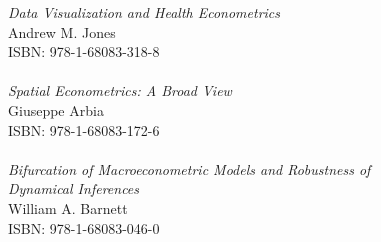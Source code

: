 \vspace{12pt}
\noindent \textit{Data Visualization and Health Econometrics}\\
Andrew M. Jones\\
ISBN: 978-1-68083-318-8\\
\\
\noindent \textit{Spatial Econometrics: A Broad View}\\
Giuseppe Arbia\\
ISBN: 978-1-68083-172-6\\
\\
\noindent \textit{Bifurcation of Macroeconometric Models and Robustness of\\ Dynamical Inferences}\\
William A. Barnett\\
ISBN: 978-1-68083-046-0